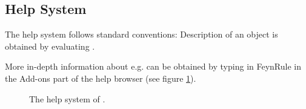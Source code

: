 \subsection{Help System}

The help system follows standard \mma conventions: Description of an object  is obtained by evaluating .

\beom
{}
\enom

More in-depth information about e.g.  can be obtained by typing in FeynRule in the Add-ons part of the help browser (see figure \ref{help}).

\begin{figure}[ht]
\ifthenelse{\pdf = 0 \or \isundefined{\pdfoutput}}{\setlength\abovecaptionskip{-80pt}}{}
\begin{center}
\caption{The help system of \fc.}
\label{help}
\end{center}
\end{figure}

